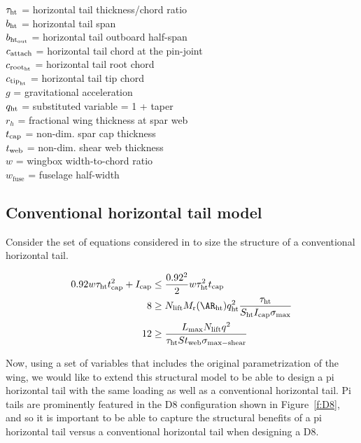 \begin{tabbing}
$\tau_{\rm{ht}}$ = horizontal tail thickness/chord ratio \\
$b_{\rm{ht}}$ = horizontal tail span \\
$b_{\rm{ht}_{\rm{out}}}$ = horizontal tail outboard half-span\\
$c_{\rm{attach}}$ = horizontal tail chord at the pin-joint \\
$c_{\rm{root}_{\rm{ht}}}$ = horizontal tail root chord \\
$c_{\rm{tip}_{\rm{ht}}}$ = horizontal tail tip chord \\
$g$ = gravitational acceleration \\
$q_{\rm{ht}}$ = substituted variable = 1 + taper \\
$r_h$ = fractional wing thickness at spar web \\
$t_{\rm{cap}}$ = non-dim. spar cap thickness \\
$t_{\rm{web}}$ = non-dim. shear web thickness \\
$w$ = wingbox width-to-chord ratio \\
$w_{\textrm{fuse}}$ = fuselage half-width \\
\end{tabbing}

\subsection{Conventional horizontal tail model}

Consider the set of equations considered in \cite{sp_ac_design} to size
the structure of a conventional horizontal tail. 

\begin{align}
\label{e:HTorig}
\begin{split}
    0.92 w\tau_{\rm{ht}} t_{\rm{cap}}^2 + I_{\rm{cap}} &\leq \frac{0.92^2}{2}w\tau_{\rm{ht}}^2t_{\rm{cap}}\\
    8 &\geq N_{\rm{lift}}M_{\rm{r}}(\AR_{\rm{ht}})q_{\rm{ht}}^2\frac{\tau_{\rm{ht}}}{S_{\rm{ht}} I_{\rm{cap}}\sigma_{\rm{max}}}\\
    12 &\geq \frac{L_{\rm{max}} N_{\rm{lift}} q^2}{\tau_{\rm{ht}} S t_{\rm{web}} \sigma_{\rm{max-shear}}}
\end{split}
\end{align}

Now, using a set of variables that includes the original parametrization of the wing, 
we would like to extend this structural model to be able to design a pi horizontal tail
with the same loading as well as a conventional horizontal tail. Pi tails are prominently
featured in the D8 configuration shown in Figure~\ref{f:D8}, and so it is important to
be able to capture the structural benefits of a pi horizontal tail versus a conventional
horizontal tail when designing a D8.


